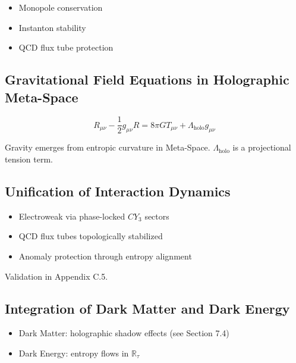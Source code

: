 \documentclass[10.5pt,a4paper]{article}
\begin{document}
\begin{itemize}
    \item Monopole conservation
    \item Instanton stability
    \item QCD flux tube protection
\end{itemize}

\subsection{Gravitational Field Equations in Holographic Meta-Space}

\[
R_{\mu\nu} - \frac{1}{2} g_{\mu\nu} R = 8 \pi G T_{\mu\nu} + \Lambda_{\text{holo}} g_{\mu\nu}
\]

Gravity emerges from entropic curvature in Meta-Space. \(\Lambda_{\text{holo}}\) is a projectional tension term.

\subsection{Unification of Interaction Dynamics}

\begin{itemize}
    \item Electroweak via phase-locked \(CY_3\) sectors
    \item QCD flux tubes topologically stabilized
    \item Anomaly protection through entropy alignment
\end{itemize}

Validation in Appendix C.5.

\subsection{Integration of Dark Matter and Dark Energy}

\begin{itemize}
    \item Dark Matter: holographic shadow effects (see Section 7.4)
    \item Dark Energy: entropy flows in \(\mathbb{R}_\tau\)
\end{itemize}
\end{document}
